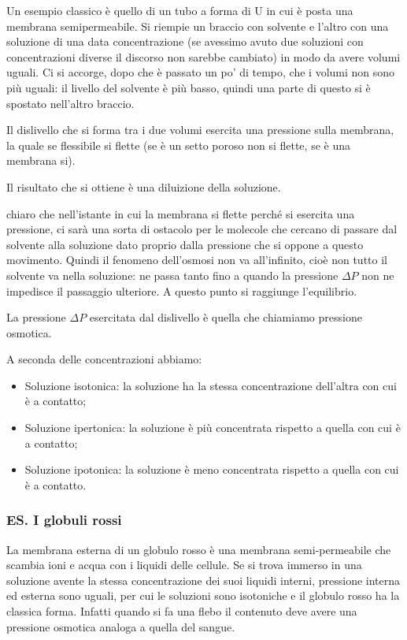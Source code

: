 Un esempio classico è quello di un tubo a forma di U in cui è posta una membrana semipermeabile. Si riempie un braccio con solvente e l'altro con una soluzione di una data concentrazione (se avessimo avuto due soluzioni con concentrazioni diverse il discorso non sarebbe cambiato) in modo da avere volumi uguali. Ci si accorge, dopo che è passato un po' di tempo, che i volumi non sono più uguali: il livello del solvente è più basso, quindi una parte di questo si è spostato nell'altro braccio.

Il dislivello che si forma tra i due volumi esercita una pressione sulla membrana, la quale se flessibile si flette (se è un setto poroso non si flette, se è una membrana si).

Il risultato che si ottiene è una diluizione della soluzione.

\E chiaro che nell'istante in cui la membrana si flette perché si esercita una pressione, ci sarà una sorta di ostacolo per le molecole che cercano di passare dal solvente alla soluzione dato proprio dalla pressione che si oppone a questo movimento. Quindi il fenomeno dell'osmosi non va all'infinito, cioè non tutto il solvente va nella soluzione: ne passa tanto fino a quando la pressione $\Delta P$ non ne impedisce il passaggio ulteriore. A questo punto si raggiunge l'equilibrio.

La pressione $\Delta P$ esercitata dal dislivello è quella che chiamiamo pressione osmotica.

A seconda delle concentrazioni abbiamo:

\begin{itemize}
    \item Soluzione isotonica: la soluzione ha la stessa concentrazione dell'altra con cui è a contatto;
    \item Soluzione ipertonica: la soluzione è più concentrata rispetto a quella con cui è a contatto;
    \item Soluzione ipotonica: la soluzione è meno concentrata rispetto a quella con cui è a contatto.
\end{itemize}

\subsubsection{ES. I globuli rossi}
La membrana esterna di un globulo rosso è una membrana semi-permeabile che scambia ioni e acqua con i liquidi delle cellule. Se si trova immerso in una soluzione avente la stessa concentrazione dei suoi liquidi interni, pressione interna ed esterna sono uguali, per cui le soluzioni sono isotoniche e il globulo rosso ha la classica forma. Infatti quando si fa una flebo il contenuto deve avere una pressione osmotica analoga a quella del sangue.

